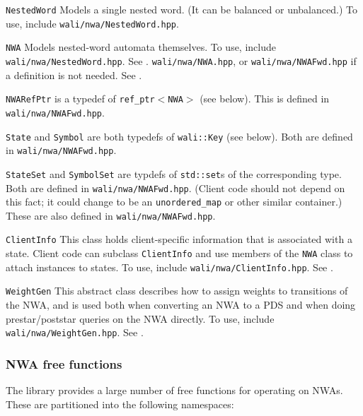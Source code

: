\begin{description}
  \item\texttt{NestedWord} Models a single nested word. (It can be
    balanced or unbalanced.) To use, include \texttt{wali/nwa/NestedWord.hpp}.
  \item\texttt{NWA} Models nested-word automata themselves. To use, include
    \texttt{wali/nwa/NestedWord.hpp}. See .
    \texttt{wali/nwa/NWA.hpp}, or \texttt{wali/nwa/NWAFwd.hpp} if a
    definition is not needed. See .
  \item\texttt{NWARefPtr} is a typedef of \texttt{ref\_ptr$<$NWA$>$} (see
    below). This is defined in \texttt{wali/nwa/NWAFwd.hpp}.
  \item\texttt{State} and \texttt{Symbol} are both typedefs of
    \texttt{wali::Key} (see below). Both are defined in
    \texttt{wali/nwa/NWAFwd.hpp}.
  \item\texttt{StateSet} and \texttt{SymbolSet} are typdefs of
    \texttt{std::set}s of the corresponding type. Both are defined in
    \texttt{wali/nwa/NWAFwd.hpp}. (Client code should not depend on this
    fact; it could change to be an \texttt{unordered\_map} or other similar
    container.) These are also defined in \texttt{wali/nwa/NWAFwd.hpp}.
  \item\texttt{ClientInfo} This class holds client-specific information that
    is associated with a state. Client code can subclass \texttt{ClientInfo} and use
    members of the \texttt{NWA} class to attach instances to states. To use,
    include \texttt{wali/nwa/ClientInfo.hpp}. See .
  \item\texttt{WeightGen} This abstract class describes how to assign weights
    to transitions of the NWA, and is used both when converting an NWA to a
    PDS and when doing prestar/poststar queries on the NWA directly. To use,
    include \texttt{wali/nwa/WeightGen.hpp}. See .
\end{description}


\subsubsection{NWA free functions}

The library provides a large number of free functions for operating on
NWAs. These are partitioned into the following namespaces:

